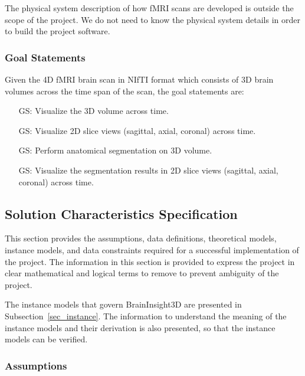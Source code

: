 \documentclass[12pt]{article}
\newcounter{goalnum} %
\begin{document}
The physical system description of how fMRI scans are developed is outside the scope
of the project. We do not need to know the physical system details in order to build
the project software.

\subsubsection{Goal Statements}


\noindent Given the 4D fMRI brain scan in NIfTI format which consists of 3D brain
volumes across the time span of the scan, the goal statements are:


\begin{itemize}

  \item[GS\refstepcounter{goalnum}\thegoalnum \label{GS1}:] Visualize the 3D volume across time.
  \item[GS\refstepcounter{goalnum}\thegoalnum \label{GS2}:] Visualize 2D slice views
        (sagittal, axial, coronal) across time.
  \item[GS\refstepcounter{goalnum}\thegoalnum \label{GS3}:] Perform anatomical segmentation
        on 3D volume.
  \item[GS\refstepcounter{goalnum}\thegoalnum \label{GS4}:] Visualize the segmentation results
        in 2D slice views (sagittal, axial, coronal) across time.

\end{itemize}

\subsection{Solution Characteristics Specification}

This section provides the assumptions, data definitions, theoretical models,
instance models, and data constraints required for a successful implementation of the project.
The information in this section is provided to express the project in clear mathematical and
logical terms to remove to prevent ambiguity of the project.

The instance models that govern BrainInsight3D are presented in
Subsection~\ref{sec_instance}.  The information to understand the meaning of the
instance models and their derivation is also presented, so that the instance
models can be verified.


\subsubsection{Assumptions} \label{sec_assumpt}
\end{document}
